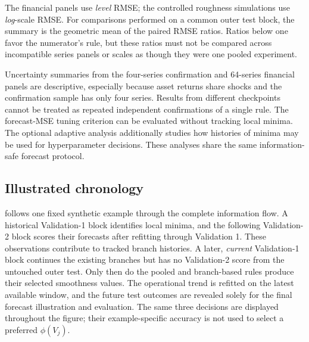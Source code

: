 The financial panels use \emph{level} RMSE; the controlled
roughness simulations use \emph{log}-scale RMSE. For comparisons
performed on a common outer test block, the summary is the
geometric mean of the paired RMSE ratios. Ratios below one favor
the numerator's rule, but these ratios must not be compared across
incompatible series panels or scales as though they were one
pooled experiment.

Uncertainty summaries from the four-series confirmation and
64-series financial panels are descriptive, especially because
asset returns share shocks and the confirmation sample has only
four series. Results from different checkpoints cannot be treated
as repeated independent confirmations of a single rule.
The forecast-MSE tuning criterion can be evaluated without tracking
local minima. The optional adaptive analysis additionally studies
how histories of minima may be used for hyperparameter decisions.
These analyses share the same information-safe forecast protocol.


\subsection{Illustrated chronology}

 follows one fixed synthetic example
through the complete information flow. A historical Validation-1 block
identifies local minima, and the following Validation-2 block scores their
forecasts after refitting through Validation 1. These observations contribute
to tracked branch histories. A later, \emph{current} Validation-1 block
continues the existing branches but has no Validation-2 score from the
untouched outer test. Only then do the pooled and branch-based rules
produce their selected smoothness values. The operational trend is
refitted on the latest available window, and the future test outcomes
are revealed solely for the final forecast illustration and evaluation.
The same three decisions are displayed throughout the figure; their
example-specific accuracy is not used to select a preferred
$\phi(V_j)$.


